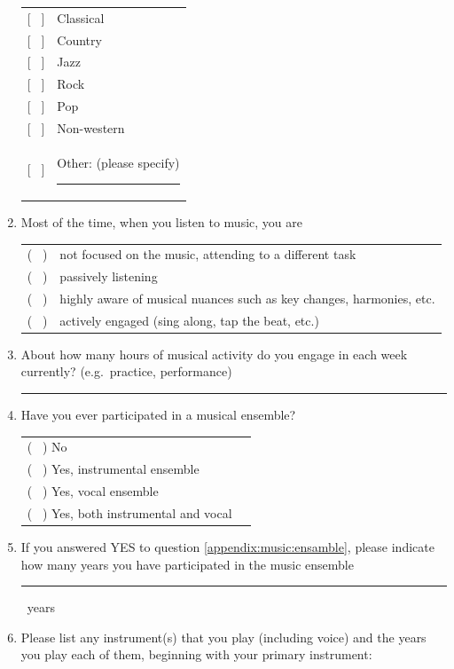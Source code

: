 \documentclass[a4paper,11pt]{article}
\newcommand{\myunderline}{\rule{2in}{.5pt}}
\begin{document}
\begin{appendices}
\begin{enumerate}[resume]
	\begin{tabular}{l l}
		{[{ \ }]} & Classical \\
		{[{ \ }]} & Country \\
		{[{ \ }]} & Jazz \\
		{[{ \ }]} & Rock \\
		{[{ \ }]} & Pop \\
		{[{ \ }]} & Non-western \\
		{[{ \ }]} & Other: (please specify) \myunderline \\
	\end{tabular}

	\item Most of the time, when you listen to music, you are

	\begin{tabular}{l l}
		( \ ) & not focused on the music, attending to a different task \\
		( \ ) & passively listening \\
		( \ ) & highly aware of musical nuances such as key changes, harmonies, etc. \\
		( \ ) & actively engaged (sing along, tap the beat, etc.) \\
	\end{tabular}

	\item About how many hours of musical activity do you engage in each week currently? (e.g.\ practice, performance)

	\myunderline

	\item \label{appendix:music:ensamble}Have you ever participated in a musical ensemble?

	\begin{tabular}{l l}
		( \ ) No \\
		( \ ) Yes, instrumental ensemble \\
		( \ ) Yes, vocal ensemble \\
		( \ ) Yes, both instrumental and vocal \\
	\end{tabular}

	\item If you answered YES to question \ref{appendix:music:ensamble}, please indicate how many years you have participated in the music ensemble

	\myunderline \ years

	\item Please list any instrument(s) that you play (including voice) and the years you play each of them, beginning with your primary instrument:


\end{enumerate}
\end{appendices}
\end{document}
